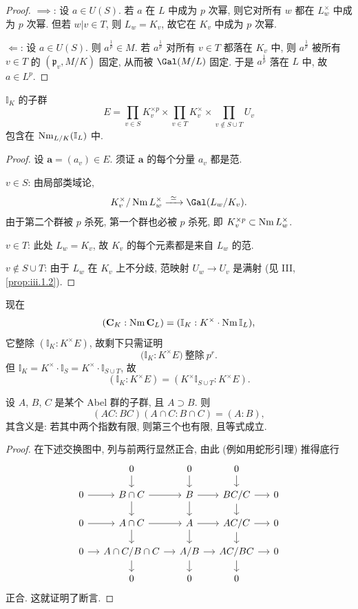 \begin{proof}
$\implies$: 设 $a\in U(S)$. 若 $a$ 在 $L$ 中成为 $p$ 次幂, 则它对所有 $w$ 都在 $L_w^{\times}$ 中成为 $p$ 次幂. 但若 $w|v\in T$, 则 $L_w=K_v$, 故它在 $K_v$ 中成为 $p$ 次幂.

$\Longleftarrow$: 设 $a\in U(S)$. 则 $a^{\frac{1}{p}}\in M$. 若 $a^{\frac{1}{p}}$ 对所有 $v\in T$ 都落在 $K_v$ 中, 则 $a^{\frac{1}{p}}$ 被所有 $v\in T$ 的 $(\mathfrak{p}_v,M/K)$ 固定, 从而被 $\Gal(M/L)$ 固定. 于是 $a^{\frac{1}{p}}$ 落在 $L$ 中, 故 $a\in L^{p}$.
\end{proof}

\begin{lemma}\label{lem:vii.6.4}
$\mathbb{I}_K$ 的子群
\[
E=\prod_{v\in S}K_{v}^{\times p}\times\prod_{v\in T}K_{v}^{\times}\times\prod_{v\notin S\cup T}U_{v}
\]
包含在 $\operatorname{Nm}_{L/K}(\mathbb{I}_L)$ 中.
\end{lemma}

\begin{proof}
设 $\mathbf{a}=(a_v)\in E$. 须证 $\mathbf{a}$ 的每个分量 $a_v$ 都是范.

$v\in S$: 由局部类域论,
\[
K_{v}^{\times}/\Nm L_{w}^{\times}\xrightarrow{\ \simeq\ }\Gal(L_{w}/K_{v}).
\]
由于第二个群被 $p$ 杀死, 第一个群也必被 $p$ 杀死, 即 $K_v^{\times p}\subset\operatorname{Nm} L_w^{\times}$.

$v\in T$: 此处 $L_w=K_v$, 故 $K_v$ 的每个元素都是来自 $L_w$ 的范.

$v\notin S\cup T$: 由于 $L_w$ 在 $K_v$ 上不分歧, 范映射 $U_w\to U_v$ 是满射 (见 III, \ref{prop:iii.1.2}).
\end{proof}

现在
\[
(\mathbf{C}_{K}:\operatorname{Nm}\mathbf{C}_{L})=(\mathbb{I}_{K}:K^{\times}\cdot\operatorname{Nm}\mathbb{I}_{L}),
\]
它整除 $(\mathbb{I}_K:K^{\times}E)$, 故剩下只需证明
\[
\bigl(\mathbb{I}_{K}:K^{\times}E\bigr)\ \text{整除}\ p^{r}.
\]
但 $\mathbb{I}_K=K^{\times}\cdot\mathbb{I}_S=K^{\times}\cdot\mathbb{I}_{S\cup T}$, 故
\[
(\mathbb{I}_{K}:K^{\times}E)=(K^{\times}\mathbb{I}_{S\cup T}:K^{\times}E).
\]

\begin{lemma}\label{lem:vii.6.5}
设 $A$, $B$, $C$ 是某个 Abel 群的子群, 且 $A\supset B$. 则
\[
(AC:BC)(A\cap C:B\cap C)=(A:B),
\]
其含义是: 若其中两个指数有限, 则第三个也有限, 且等式成立.
\end{lemma}

\begin{proof}
在下述交换图中, 列与前两行显然正合, 由此 (例如用蛇形引理) 推得底行
\[
\begin{tikzcd}[column sep=1.2em, row sep=1.2em]
 & 0 \ar[d] & 0 \ar[d] & 0 \ar[d] & \\
0 \ar[r] & B\cap C \ar[r] \ar[d] & B \ar[r] \ar[d] & BC/C \ar[d] \ar[r] & 0 \\
0 \ar[r] & A\cap C \ar[r] \ar[d] & A \ar[r] \ar[d] & AC/C \ar[d] \ar[r] & 0 \\
0 \ar[r] & A\cap C/B\cap C \ar[r] \ar[d] & A/B \ar[r] \ar[d] & AC/BC \ar[r] \ar[d] & 0 \\
 & 0 & 0 & 0 &
\end{tikzcd}
\]
正合. 这就证明了断言.
\end{proof}

